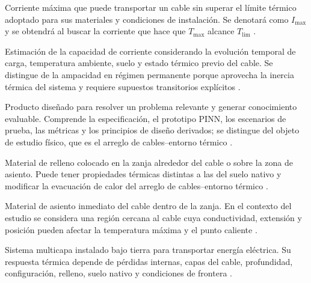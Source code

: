 \documentclass[11pt,a4paper,oneside]{report}
\newcommand{\Tmax}{T_{\max}}
\newcommand{\Imax}{I_{\max}}
\begin{document}
\begin{description}[style=nextline,itemsep=0.5\baselineskip,parsep=0pt,topsep=0.25\baselineskip]
  \item[Ampacidad.] Corriente máxima que puede transportar un cable sin superar el límite térmico adoptado para sus materiales y condiciones de instalación. Se denotará como $\Imax$ y se obtendrá al buscar la corriente que hace que $\Tmax$ alcance $T_{\mathrm{lim}}$ \parencites[752--760]{neher1957}{anders2005}[cláusulas 4--5]{iec60287}[3--6]{enescu2021}.

  \item[Ampacidad dinámica o DTR.] Estimación de la capacidad de corriente considerando la evolución temporal de carga, temperatura ambiente, suelo y estado térmico previo del cable. Se distingue de la ampacidad en régimen permanente porque aprovecha la inercia térmica del sistema y requiere supuestos transitorios explícitos \parencites[cláusulas 2--4]{iec60853}[3--6]{enescu2021}[14843--14845]{fariz2026}.

  \item[Artefacto.] Producto diseñado para resolver un problema relevante y generar conocimiento evaluable. Comprende la especificación, el prototipo PINN, los escenarios de prueba, las métricas y los principios de diseño derivados; se distingue del objeto de estudio físico, que es el arreglo de cables--entorno térmico \parencites[55--56]{peffers2007}[342--350]{gregor2013}.

  \item[Backfill.] Material de relleno colocado en la zanja alrededor del cable o sobre la zona de asiento. Puede tener propiedades térmicas distintas a las del suelo nativo y modificar la evacuación de calor del arreglo de cables--entorno térmico \parencites{anders2005}[1--3]{atoccsa2024}[1,10,16]{kim2025}[secciones 4--6]{ieee442}.

  \item[Bedding.] Material de asiento inmediato del cable dentro de la zanja. En el contexto del estudio se considera una región cercana al cable cuya conductividad, extensión y posición pueden afectar la temperatura máxima y el punto caliente \parencites[1--4]{oclon2015}[1,10,16]{kim2025}[secciones 4--6]{ieee442}.

  \item[Cable eléctrico enterrado.] Sistema multicapa instalado bajo tierra para transportar energía eléctrica. Su respuesta térmica depende de pérdidas internas, capas del cable, profundidad, configuración, relleno, suelo nativo y condiciones de frontera \parencites[752--760]{neher1957}{anders2005}[3--5]{enescu2020}[fig.~2]{kim2025}.


\end{description}
\end{document}
